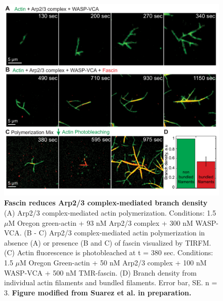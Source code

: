 \begin{figure}
\centering
\includegraphics[width=\textwidth]{img/ch03/Thesis_branching.pdf}
\caption[Fascin reduces Arp2/3 complex-mediated branch density]{\textbf{Fascin reduces Arp2/3 complex-mediated branch density} (A) Arp2/3 complex-mediated actin polymerization. Conditions: 1.5 $\mu$M Oregon green-actin + 93 nM Arp2/3 complex + 300 nM WASP-VCA.
(B - C) Arp2/3 complex-mediated actin polymerization in absence (A) or presence (B and C) of fascin visualized by TIRFM. (C) Actin fluorescence is photobleached at t = 380 sec. Conditions: 1.5 $\mu$M Oregon Green-actin + 50 nM Arp2/3 complex + 100 nM WASP-VCA + 500 nM TMR-fascin. (D) Branch density from individual actin filaments and bundled filaments. Error bar, SE. n = 3. \textbf{Figure modified from Suarez et al. in preparation.}}
\label{fig:fascin_branching}
\end{figure}


